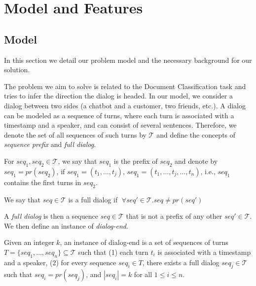 \section{Model and Features}\label{sec:model}

\subsection{Model}
In this section we detail our problem model and the necessary background 
for our solution.

The problem we aim to solve is related to the Document Classification task 
\cite{attention,Slonim:2002:UDC:564376.564401,DBLP:journals/tkde/IsaLKR08} 
and tries to infer the direction the dialog is headed. 
In our model, we consider a dialog between two sides (a chatbot and a customer, two friends, etc.). 
A dialog can be modeled as a sequence of turns, 
where each turn is associated with a timestamp and a speaker, and can consist of several sentences. 
Therefore, we denote the set of all sequences of 
such turns by $\mathcal{T}$ and define the concepts of {\em sequence prefix} and {\em full dialog}. 

\begin{definition}
For $seq_1, seq_2 \in \mathcal{T}$, we say that $seq_1$ is the 
prefix of $seq_2$ and denote by $seq_1 = pr(seq_2)$, if 
$seq_1 = (t_1, \ldots, t_j)$, $seq_1 = (t_1, \ldots, t_j, \ldots, t_n)$, i.e., $seq_1$ contains the first 
turns in $seq_2$. 

We say that $seq \in \mathcal{T}$ is a full dialog if $\;\forall seq' \in \mathcal{T}. seq \neq pr(seq')\; $ 
\end{definition}

A {\em full dialog} is then a sequence $seq \in \mathcal{T}$ that is not a prefix 
of any other $seq' \in \mathcal{T}$. 
We then define an instance of {\em dialog-end}. 

\begin{definition}\label{def:target}
Given an integer $k$, an instance of dialog-end is a set of sequences of turns $T=\{seq_1, \ldots, seq_n\} \subseteq \mathcal{T}$ such that 
(1) each turn $t_i$ is associated with a timestamp and a speaker, (2) for every sequence $seq_i\in T$, there exists a full dialog $seq_j\in \mathcal{T}$ such that $seq_i = pr(seq_j)$, and $|seq_i| = k$ for all $1\leq i \leq n$.
\end{definition}

